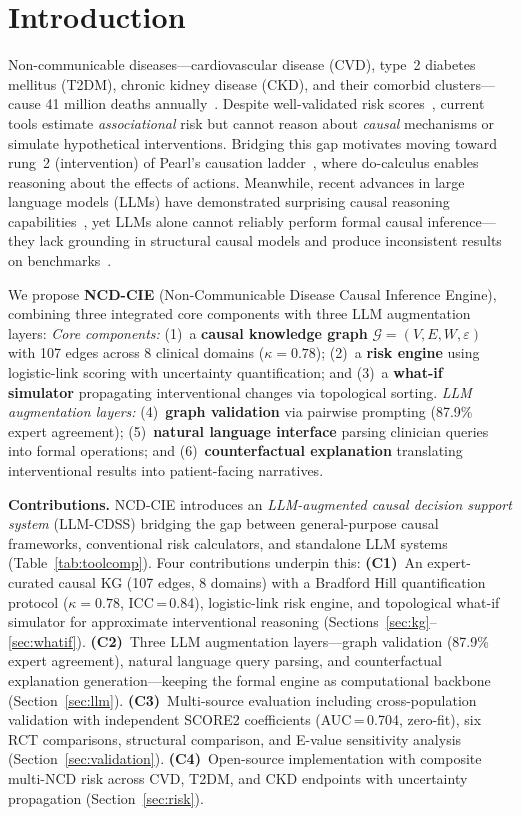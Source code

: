 \documentclass[runningheads]{llncs}
\begin{document}
\section{Introduction}\label{sec:intro}

Non-communicable diseases---cardiovascular disease (CVD), type~2
diabetes mellitus (T2DM), chronic kidney disease (CKD), and their
comorbid clusters---cause 41 million deaths
annually~\cite{who2021ncd}.
Despite well-validated risk scores~\cite{dagostino2008,hippisley2017qrisk3,score22021},
current tools estimate \emph{associational} risk but cannot reason about
\emph{causal} mechanisms or simulate hypothetical interventions.
Bridging this gap motivates moving toward rung~2 (intervention)
of Pearl's causation ladder~\cite{pearl2018book}, where
do-calculus enables reasoning about the effects of actions.
Meanwhile, recent advances in large language models (LLMs) have
demonstrated surprising causal reasoning
capabilities~\cite{ma2024causal,kiciman2023causal}, yet LLMs alone
cannot reliably perform formal causal inference---they lack grounding
in structural causal models and produce inconsistent results on
benchmarks~\cite{jin2023cladder}.

We propose \textbf{NCD-CIE} (Non-Communicable Disease Causal Inference
Engine), combining three integrated core components with three
LLM augmentation layers:
\noindent\emph{Core components:}
(1)~a \textbf{causal knowledge graph} $\mathcal{G}=(V,E,W,\varepsilon)$
  with 107 edges across 8 clinical domains ($\kappa=0.78$);
(2)~a \textbf{risk engine} using logistic-link scoring with
  uncertainty quantification; and
(3)~a \textbf{what-if simulator} propagating interventional changes
  via topological sorting.
\emph{LLM augmentation layers:}
(4)~\textbf{graph validation} via pairwise prompting (87.9\% expert
  agreement);
(5)~\textbf{natural language interface} parsing clinician queries
  into formal operations; and
(6)~\textbf{counterfactual explanation} translating interventional
  results into patient-facing narratives.

\noindent\textbf{Contributions.}
NCD-CIE introduces an \emph{LLM-augmented causal decision support
system} (LLM-CDSS) bridging the gap between general-purpose causal
frameworks, conventional risk calculators, and standalone LLM systems
(Table~\ref{tab:toolcomp}).
Four contributions underpin this:
\textbf{(C1)}~An expert-curated causal KG (107 edges, 8 domains)
with a Bradford Hill quantification protocol ($\kappa=0.78$,
ICC\,=\,0.84), logistic-link risk engine, and topological what-if
simulator for approximate interventional reasoning
(Sections~\ref{sec:kg}--\ref{sec:whatif}).
\textbf{(C2)}~Three LLM augmentation layers---graph validation
(87.9\% expert agreement), natural language query parsing, and
counterfactual explanation generation---keeping the formal engine
as computational backbone (Section~\ref{sec:llm}).
\textbf{(C3)}~Multi-source evaluation including cross-population
validation with independent SCORE2 coefficients
(AUC\,=\,0.704, zero-fit), six RCT comparisons,
structural comparison, and E-value sensitivity analysis
(Section~\ref{sec:validation}).
\textbf{(C4)}~Open-source implementation with composite multi-NCD
risk across CVD, T2DM, and CKD endpoints with uncertainty
propagation (Section~\ref{sec:risk}).
\end{document}
